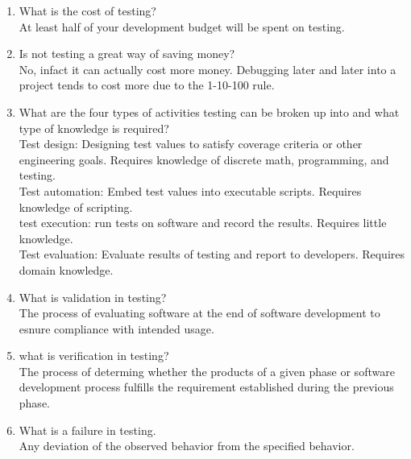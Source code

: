 \documentclass[10pt]{article}
\begin{document}
\begin{enumerate}
      \item What is the cost of testing?\\
            At least half of your development budget will be spent on testing.\\

      \item Is not testing a great way of saving money?\\
            No, infact it can actually cost more money. Debugging later and later into a project tends to cost more due to the 1-10-100 rule.\\

      \item What are the four types of activities testing can be broken up into and what type of knowledge is required?\\
            Test design: Designing test values to satisfy coverage criteria or other engineering goals. Requires knowledge of discrete math, programming, and testing.\\
            Test automation: Embed test values into executable scripts. Requires knowledge of scripting.\\
            test execution: run tests on software and record the results. Requires little knowledge.\\
            Test evaluation: Evaluate results of testing and report to developers. Requires domain knowledge.\\

      \item What is validation in testing?\\
            The process of evaluating software at the end of software development to esnure compliance with intended usage.\\

      \item what is verification in testing?\\
            The process of determing whether the products of a given phase or software development process fulfills the requirement established during the previous phase.\\

      \item What is a failure in testing.\\
            Any deviation  of the observed behavior from the specified behavior.\\


\end{enumerate}
\end{document}
